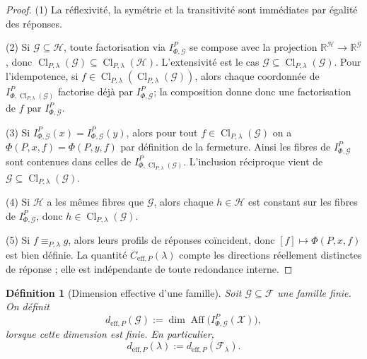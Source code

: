 \documentclass[11pt,a4paper,openany]{book}
\newtheorem{definition}{Définition}[chapter]
\DeclareMathOperator{\Aff}{Aff}
\begin{document}
\begin{proof}
(1) La réflexivité, la symétrie et la transitivité sont immédiates par égalité des réponses.

(2) Si \(\mathcal G\subseteq\mathcal H\), toute factorisation via \(I_{\Phi,\mathcal G}^P\) se compose avec la projection \(\mathbb R^{\mathcal H}\to\mathbb R^{\mathcal G}\), donc \(\operatorname{Cl}_{P,\lambda}(\mathcal G)\subseteq \operatorname{Cl}_{P,\lambda}(\mathcal H)\). L'extensivité est le cas \(\mathcal G\subseteq \operatorname{Cl}_{P,\lambda}(\mathcal G)\). Pour l'idempotence, si \(f\in \operatorname{Cl}_{P,\lambda}(\operatorname{Cl}_{P,\lambda}(\mathcal G))\), alors chaque coordonnée de \(I_{\Phi,\operatorname{Cl}_{P,\lambda}(\mathcal G)}^P\) factorise déjà par \(I_{\Phi,\mathcal G}^P\); la composition donne donc une factorisation de \(f\) par \(I_{\Phi,\mathcal G}^P\).

(3) Si \(I_{\Phi,\mathcal G}^P(x)=I_{\Phi,\mathcal G}^P(y)\), alors pour tout \(f\in\operatorname{Cl}_{P,\lambda}(\mathcal G)\) on a \(\Phi(P,x,f)=\Phi(P,y,f)\) par définition de la fermeture. Ainsi les fibres de \(I_{\Phi,\mathcal G}^P\) sont contenues dans celles de \(I_{\Phi,\operatorname{Cl}_{P,\lambda}(\mathcal G)}^P\). L'inclusion réciproque vient de \(\mathcal G\subseteq\operatorname{Cl}_{P,\lambda}(\mathcal G)\).

(4) Si \(\mathcal H\) a les mêmes fibres que \(\mathcal G\), alors chaque \(h\in\mathcal H\) est constant sur les fibres de \(I_{\Phi,\mathcal G}^P\), donc \(h\in \operatorname{Cl}_{P,\lambda}(\mathcal G)\).

(5) Si \(f\equiv_{P,\lambda}g\), alors leurs profils de réponses coïncident, donc \([f]\mapsto \Phi(P,x,f)\) est bien définie. La quantité \(C_{\mathrm{eff},P}(\lambda)\) compte les directions réellement distinctes de réponse ; elle est indépendante de toute redondance interne.
\end{proof}

\begin{definition}[Dimension effective d'une famille]
Soit \(\mathcal G\subseteq\mathcal F\) une famille finie. On définit
\[
d_{\mathrm{eff},P}(\mathcal G):=\dim \Aff\!\bigl(I_{\Phi,\mathcal G}^P(\mathcal X)\bigr),
\]
lorsque cette dimension est finie. En particulier,
\[
d_{\mathrm{eff},P}(\lambda):=d_{\mathrm{eff},P}(\mathcal F_\lambda).
\]
\end{definition}
\end{document}
